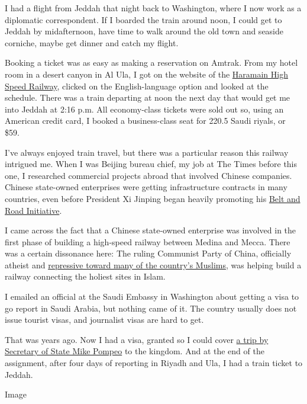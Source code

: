 I had a flight from Jeddah that night back to Washington, where I now
work as a diplomatic correspondent. If I boarded the train around noon,
I could get to Jeddah by midafternoon, have time to walk around the old
town and seaside corniche, maybe get dinner and catch my flight.

Booking a ticket was as easy as making a reservation on Amtrak. From my
hotel room in a desert canyon in Al Ula, I got on the website of the
\href{https://www.hhr.sa/sites/sro/Pages/home.aspx}{Haramain High Speed
Railway}, clicked on the English-language option and looked at the
schedule. There was a train departing at noon the next day that would
get me into Jeddah at 2:16 p.m. All economy-class tickets were sold out
so, using an American credit card, I booked a business-class seat for
220.5 Saudi riyals, or \$59.

I've always enjoyed train travel, but there was a particular reason this
railway intrigued me. When I was Beijing bureau chief, my job at The
Times before this one, I researched commercial projects abroad that
involved Chinese companies. Chinese state-owned enterprises were getting
infrastructure contracts in many countries, even before President Xi
Jinping began heavily promoting his
\href{https://www.nytimes.com/2019/01/13/world/africa/china-loans-africa-usa.html}{Belt
and Road Initiative}.

I came across the fact that a Chinese state-owned enterprise was
involved in the first phase of building a high-speed railway between
Medina and Mecca. There was a certain dissonance here: The ruling
Communist Party of China, officially atheist and
\href{https://www.nytimes.com/2018/09/10/world/asia/us-china-sanctions-muslim-camps.html}{repressive
toward many of the country's Muslims}, was helping build a railway
connecting the holiest sites in Islam.

I emailed an official at the Saudi Embassy in Washington about getting a
visa to go report in Saudi Arabia, but nothing came of it. The country
usually does not issue tourist visas, and journalist visas are hard to
get.

That was years ago. Now I had a visa, granted so I could cover
\href{https://www.nytimes.com/2019/01/14/world/middleeast/pompeo-saudi-arabia-mohammed-bin-salman.html}{a
trip by Secretary of State Mike Pompeo} to the kingdom. And at the end
of the assignment, after four days of reporting in Riyadh and Ula, I had
a train ticket to Jeddah.

Image

